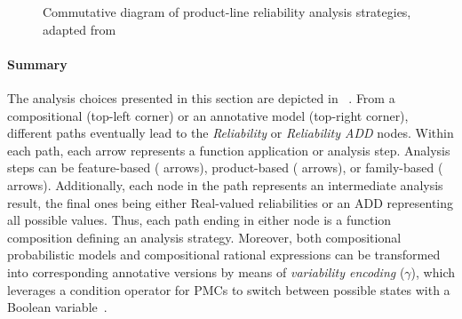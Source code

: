 \begin{figure}[!htbp]
	\caption{Commutative diagram of product-line reliability analysis strategies, adapted from~\citet{Castro2017}}
	\label{fig:strategies-overview}
\end{figure}

\paragraph{Summary}
The analysis choices presented in this section are depicted in ~\cite{Castro2017}.
From a compositional (top-left corner) or an annotative model (top-right corner), different paths eventually lead to the \textit{Reliability} or \textit{Reliability ADD} nodes.
Within each path, each arrow represents a function application or analysis step.
Analysis steps can be feature-based (\featureStyleArrow{} arrows), product-based (\productStyleArrow{} arrows), or family-based (\familyStyleArrow{} arrows).
Additionally, each node in the path represents an intermediate analysis result, the final ones being either Real-valued reliabilities or an ADD representing all possible values. Thus, each path ending in either node is a function composition defining an analysis strategy.
Moreover, both compositional probabilistic models and compositional rational expressions can be transformed into corresponding annotative versions by means of \textit{variability encoding} ($\gamma$), which leverages a condition operator for PMCs to switch between possible states with a Boolean variable~\cite{Castro2017}.

